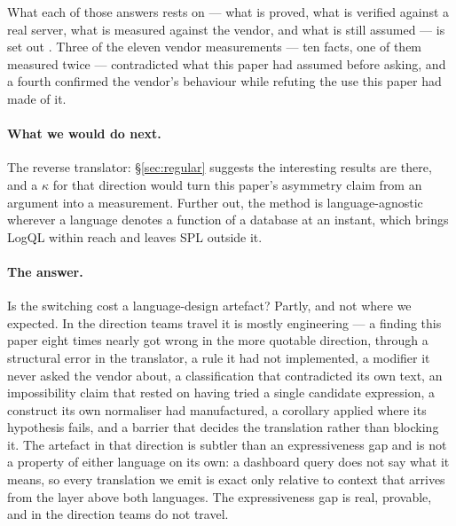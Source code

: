 \noindent
What each of those answers rests on --- what is proved, what is verified against a real
server, what is measured against the vendor, and what is still assumed --- is set out
. Three of the eleven vendor measurements --- ten facts, one of
them measured twice --- contradicted what this
paper had assumed before asking, and a fourth confirmed the vendor's behaviour while
refuting the use this paper had made of it.

\iffull\fi

\paragraph{What we would do next.}
The reverse translator: \S\ref{sec:regular} suggests the interesting results are there, and a
$\kappa$ for that direction would turn this paper's asymmetry claim from an argument into
a measurement. Further out, the method is language-agnostic wherever a language denotes a
function of a database at an instant, which brings LogQL within reach and leaves SPL
outside it.

\paragraph{The answer.}
Is the switching cost a language-design artefact? Partly, and not where we expected. In
the direction teams travel it is mostly engineering --- a finding this paper eight times
nearly got wrong in the more quotable direction, through a structural error in the
translator, a rule it had not implemented, a modifier it never asked the vendor about, a
classification that contradicted its own text, an impossibility claim that rested on
having tried a single candidate expression, a construct its own normaliser had
manufactured, a corollary applied where its hypothesis fails, and a barrier that decides
the translation rather than blocking it. The artefact in that direction is
subtler than an expressiveness gap and is not a property of either language on its own: a
dashboard query does not say what it means, so every translation we emit is exact only
relative to context that arrives from the layer above both languages. The expressiveness
gap is real, provable, and in the direction teams do not travel.

